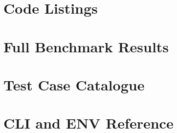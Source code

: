 \chapter{Code Listings}
\label{app:code-listings}

\chapter{Full Benchmark Results}
\label{app:benchmark-results}

\chapter{Test Case Catalogue}
\label{app:test-case-catalogue}

\chapter{CLI and ENV Reference}
\label{app:cli-env-reference}
